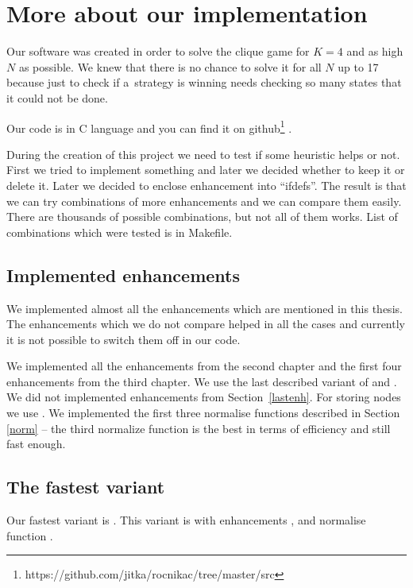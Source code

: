 \section{More about our implementation}

Our software was created in order to solve the clique game for $K=4$ and as high
$N$ as possible. We knew that there is no chance to solve it for all $N$ up
to 17 because just to check if a~strategy is winning needs checking so many
states that it could not be done. 
 
Our code is in C language and you can find it on
github\footnote{https://github.com/jitka/rocnikac/tree/master/src}
.

During the creation of this project we need to test if some heuristic helps or
not.  First we tried to implement something and later we decided whether to
keep it or delete it. Later we decided to enclose enhancement into ``ifdefs''.
The result is that we can try combinations of more enhancements and we can
compare them easily.  There are thousands of possible combinations, but not all
of them works. List of combinations which were tested is in Makefile. 

\subsection{Implemented enhancements}

We implemented almost all the enhancements which are mentioned in this thesis. 
The enhancements which we do not compare helped in all the cases and currently it is
not possible to switch them off in our code.

We implemented all the enhancements from the second chapter and the first four
enhancements from the third chapter. We use the last described variant of
 and . We did not implemented
enhancements  from
Section~\ref{lastenh}. For storing nodes we use .
We implemented the first three normalise functions described in Section \ref{norm} --
the third normalize function  is the best
in terms of efficiency and still fast enough.

\subsection{The fastest variant}

Our fastest variant is . This  variant is 
with enhancements ,  and normalise function
.

